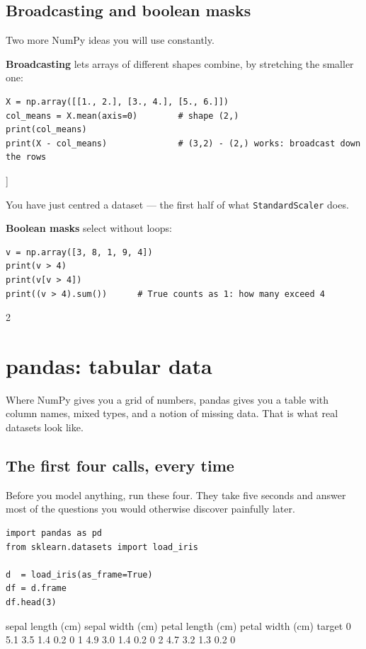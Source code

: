 \documentclass[11pt]{article}
\begin{document}
\subsection{Broadcasting and boolean masks}

Two more NumPy ideas you will use constantly.

\textbf{Broadcasting} lets arrays of different shapes combine, by stretching the
smaller one:

\begin{lstlisting}
X = np.array([[1., 2.], [3., 4.], [5., 6.]])
col_means = X.mean(axis=0)        # shape (2,)
print(col_means)
print(X - col_means)              # (3,2) - (2,) works: broadcast down the rows
\end{lstlisting}
\begin{codeout}
[3. 4.]
[[-2. -2.]
 [ 0.  0.]
 [ 2.  2.]]
\end{codeout}

You have just centred a dataset --- the first half of what \texttt{StandardScaler}
does.

\textbf{Boolean masks} select without loops:

\begin{lstlisting}
v = np.array([3, 8, 1, 9, 4])
print(v > 4)
print(v[v > 4])
print((v > 4).sum())      # True counts as 1: how many exceed 4
\end{lstlisting}
\begin{codeout}
2
\end{codeout}

\newpage
\section{pandas: tabular data}

Where NumPy gives you a grid of numbers, pandas gives you a table with column
names, mixed types, and a notion of missing data. That is what real datasets
look like.

\subsection{The first four calls, every time}

Before you model anything, run these four. They take five seconds and answer
most of the questions you would otherwise discover painfully later.

\begin{lstlisting}
import pandas as pd
from sklearn.datasets import load_iris

d  = load_iris(as_frame=True)
df = d.frame
df.head(3)
\end{lstlisting}
\begin{codeout}
   sepal length (cm)  sepal width (cm)  petal length (cm)  petal width (cm)  target
0                5.1               3.5                1.4               0.2       0
1                4.9               3.0                1.4               0.2       0
2                4.7               3.2                1.3               0.2       0
\end{codeout}
\end{document}

